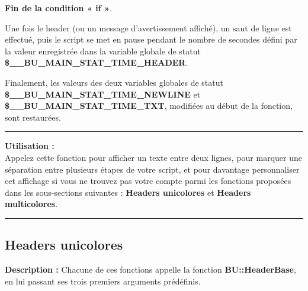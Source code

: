\documentclass[a4paper,10pt]{article}
\begin{document}
\begin{justify}
    \textbf{\color{cond}Fin de la condition « if »}.
\end{justify}

\setlength{\parskip}{2em}


\begin{justify}
    Une fois le header (ou un message d'avertissement affiché), un saut de ligne est effectué, puis le script se met en pause pendant le nombre de secondes défini par la valeur enregistrée dans la variable globale de statut \textbf{\color{vars}\$\_\_BU\_MAIN\_STAT\_TIME\_HEADER}.
\end{justify}

\setlength{\parskip}{2em}

\begin{justify}
    Finalement, les valeurs des deux variables globales de statut \textbf{\color{vars}\$\_\_BU\_MAIN\_STAT\_TIME\_NEWLINE} et \textbf{\color{vars}\$\_\_BU\_MAIN\_STAT\_TIME\_TXT}, modifiées au début de la fonction, sont restaurées.
\end{justify}

\setlength{\parskip}{1em}

\par\noindent\rule{\textwidth}{0.4pt}

\begin{justify}
    \textbf{Utilisation :}\\[1\baselineskip]
    Appelez cette fonction pour afficher un texte entre deux lignes, pour marquer une séparation entre plusieurs étapes de votre script, et pour davantage personnaliser cet affichage si vous ne trouvez pas votre compte parmi les fonctions proposées dans les sous-sections suivantes : \textbf{\color{sec2}Headers unicolores} et \textbf{\color{sec2}Headers multicolores}.
\end{justify}




\color{sec2}\par\noindent\rule{\textwidth}{0.4pt}\color{text}

\color{sec2}
\subsection{Headers unicolores}\color{text}

\begin{justify}
    \textbf{Description :}
    Chacune de ces fonctions appelle la fonction \textbf{\color{func}BU::HeaderBase}, en lui passant ses trois premiers arguments prédéfinis.
\end{justify}
\end{document}
